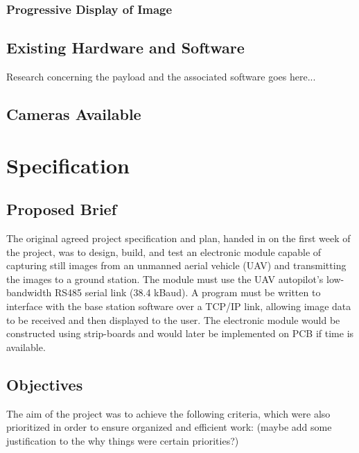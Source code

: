 \documentclass[oneside]{ecsgdp}         %
\begin{document}
\subsection{Progressive Display of Image}

\section{Existing Hardware and Software}
Research concerning the payload and the associated software goes here...

\section{Cameras Available}


\chapter{Specification}

\section{Proposed Brief}
The original agreed project specification and plan, handed in on the first week of the project, was to design, build, and test an electronic module capable of capturing still images from an unmanned aerial vehicle (UAV) and transmitting the images to a ground station. The module must use the UAV autopilot’s low-bandwidth RS485 serial link (38.4 kBaud). A program must be written to interface with the base station software over a TCP/IP link, allowing image data to be received and then displayed to the user. The electronic module would be constructed using strip-boards and would later be implemented on PCB if time is available.


\section{Objectives} 
The aim of the project was to achieve the following criteria, which were also prioritized in order to ensure organized and efficient work: (maybe add some justification to the why things were certain priorities?)
\end{document}
